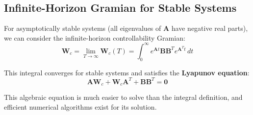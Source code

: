 \subsection{Infinite-Horizon Gramian for Stable Systems}

For asymptotically stable systems (all eigenvalues of $\mathbf{A}$ have negative real parts), we can consider the infinite-horizon controllability Gramian:
\begin{equation}
\mathbf{W}_c = \lim_{T \to \infty} \mathbf{W}_c(T) = \int_0^\infty e^{\mathbf{A}t}\mathbf{B}\mathbf{B}^Te^{\mathbf{A}^Tt} \, dt
\label{eq:controllability_gramian_infinite}
\end{equation}

This integral converges for stable systems and satisfies the \textbf{Lyapunov equation}:
\begin{equation}
\boxed{\mathbf{A}\mathbf{W}_c + \mathbf{W}_c\mathbf{A}^T + \mathbf{B}\mathbf{B}^T = \mathbf{0}}
\label{eq:lyapunov_controllability}
\end{equation}

This algebraic equation is much easier to solve than the integral definition, and efficient numerical algorithms exist for its solution.

